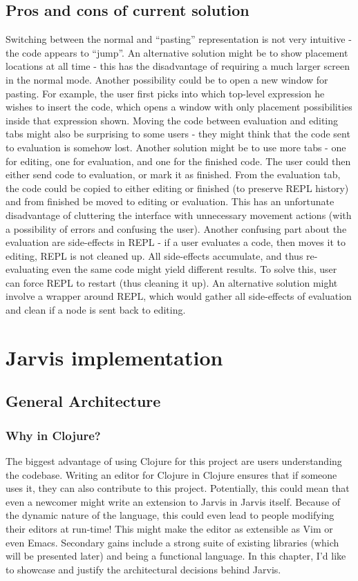 \documentclass[11pt]{scrartcl}
\begin{document}
\subsection{Pros and cons of current solution}
Switching between the normal and “pasting” representation is not very intuitive - the code appears to “jump”. An alternative solution might be to show placement locations at all time - this has the disadvantage of requiring a much larger screen in the normal mode. Another possibility could be to open a new window for pasting. For example, the user first picks into which top-level expression he wishes to insert the code, which opens a window with only placement possibilities inside that expression shown. 
Moving the code between evaluation and editing tabs might also be surprising to some users - they might think that the code sent to evaluation is somehow lost. Another solution might be to use more tabs - one for editing, one for evaluation, and one for the finished code. The user could then either send code to evaluation, or mark it as finished. From the evaluation tab, the code could be copied to either editing or finished (to preserve REPL history) and from finished be moved to editing or evaluation. This has an unfortunate disadvantage of cluttering the interface with unnecessary movement actions (with a possibility of errors and confusing the user).
Another confusing part about the evaluation are side-effects in REPL - if a user evaluates a code, then moves it to editing, REPL is not cleaned up. All side-effects accumulate, and thus re-evaluating even the same code might yield different results. To solve this, user can force REPL to restart (thus cleaning it up). An alternative solution might involve a wrapper around REPL, which would gather all side-effects of evaluation and clean if a node is sent back to editing.

\section{Jarvis implementation}
\subsection{General Architecture}
\subsubsection{Why in Clojure?}
The biggest advantage of using Clojure for this project are users understanding the codebase. Writing an editor for Clojure in Clojure ensures that if someone uses it, they can also contribute to this project. Potentially, this could mean that even a newcomer might write an extension to Jarvis in Jarvis itself. Because of the dynamic nature of the language, this could even lead to people modifying their editors at run-time! This might make the editor as extensible as Vim or even Emacs.
Secondary gains include a strong suite of existing libraries (which will be presented later) and being a functional language. In this chapter, I’d like to showcase and justify the architectural decisions behind Jarvis.
\end{document}
